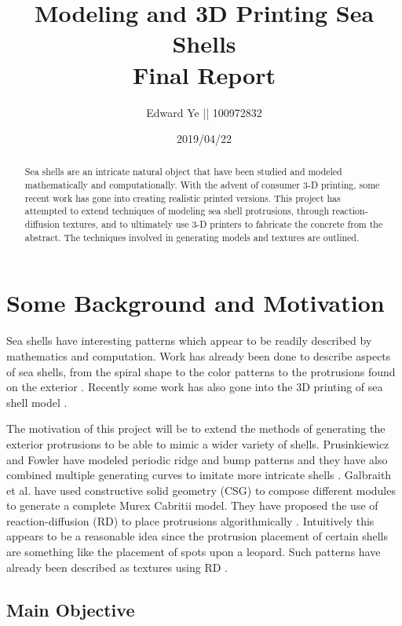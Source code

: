 \documentclass[a4paper]{article}
\title{Modeling and 3D Printing Sea Shells\\
		\large Final Report}
\author{Edward Ye || 100972832}
\date{2019/04/22}
\begin{document}
\maketitle

\begin{abstract}
	Sea shells are an intricate natural object that have been studied and modeled mathematically and computationally. With the advent of consumer 3-D printing, some recent work has gone into creating realistic printed versions. This project has attempted to extend techniques of modeling sea shell protrusions, through reaction-diffusion textures, and to ultimately use 3-D printers to fabricate the concrete from the abstract. The techniques involved in generating models and textures are outlined.
\end{abstract}

\tableofcontents

\section{Some Background and Motivation}

Sea shells have interesting patterns which  appear to be readily described by mathematics and computation. Work has already been done to describe aspects of sea shells, from the spiral shape to the color patterns to the protrusions found on the exterior \cite{Galbraith00modelingmurex}\cite{abss}\cite{VANDERHELM1998505}. Recently some work has also gone into the 3D printing of sea shell model \cite{3dprinting-seashells}\cite{bachman-3dprinting}.

The motivation of this project will be to extend the methods of generating the exterior protrusions to be able to mimic a wider variety of shells. Prusinkiewicz and Fowler have modeled periodic ridge and bump patterns and they have also combined multiple generating curves to imitate more intricate shells \cite{abss}. Galbraith et al. have used constructive solid geometry (CSG) to compose different modules to generate a complete Murex Cabritii model. They have proposed the use of reaction-diffusion (RD) to place protrusions algorithmically \cite{Galbraith00modelingmurex}. Intuitively this appears to be a reasonable idea since the protrusion placement of certain shells are something like the placement of spots upon a leopard. Such patterns have already been described as textures using RD \cite{Turk:1991:GTA:127719.122749}.

\pagebreak

\subsection{Main Objective}
\end{document}
